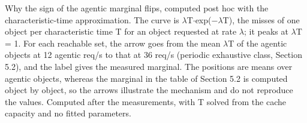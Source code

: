 Why the sign of the agentic marginal flips, computed post hoc with the characteristic-time approximation. The curve is $\lambda$T$\cdot$exp($-$$\lambda$T), the misses of one object per characteristic time T for an object requested at rate $\lambda$; it peaks at $\lambda$T = 1. For each reachable set, the arrow goes from the mean $\lambda$T of the agentic objects at 12 agentic req/s to that at 36 req/s (periodic exhaustive class, Section 5.2), and the label gives the measured marginal. The positions are means over agentic objects, whereas the marginal in the table of Section 5.2 is computed object by object, so the arrows illustrate the mechanism and do not reproduce the values. Computed after the measurements, with T solved from the cache capacity and no fitted parameters.
